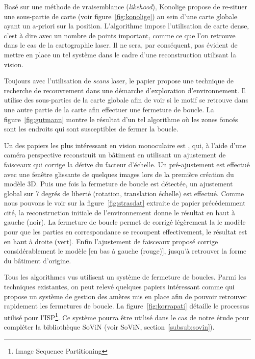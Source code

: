 Basé sur une méthode de vraisemblance (\textit{likehood}), Konolige \cite{Konolige03} propose de re-situer une sous-partie de carte (voir figure~\ref{fig:konolige}) au sein d'une carte globale ayant un a-priori sur la position.
L'algorithme impose l'utilisation de carte dense, c'est à dire avec un nombre de points important, comme ce que l'on retrouve dans le cas de la cartographie laser.
Il ne sera, par conséquent, pas évident de mettre en place un tel système dans le cadre d'une reconstruction utilisant la vision.

Toujours avec l'utilisation de \emph{scans} laser, le papier \cite{Gutmann99} propose une technique de recherche de recouvrement dans une démarche d'exploration d'environnement. 
Il utilise des sous-parties de la carte globale afin de voir si le motif se retrouve dans une autre partie de la carte afin effectuer une fermeture de boucle.
La figure~\ref{fig:gutmann} montre le résultat d'un tel algorithme où les zones foncés sont les endroits qui sont susceptibles de fermer la boucle. 

Un des papiers les plus intéressant en vision monoculaire est \cite{Strasdat10}, qui, à l'aide d'une caméra perspective reconstruit un bâtiment en utilisant un ajustement de faisceaux qui corrige la dérive du facteur d'échelle.
Un pré-ajustement est effectué avec une fenêtre glissante de quelques images lors de la première création du modèle 3D.
Puis une fois la fermeture de boucle est détectée, un ajustement global sur 7 degrés de liberté (rotation, translation échelle) est effectué.
Comme nous pouvons le voir sur la figure~\ref{fig:strasdat} extraite de papier précédemment cité, la reconstruction initiale de l'environnement donne le résultat en haut à gauche (noir).
La fermeture de boucle permet de corrigé légèrement la le modèle pour que les parties en correspondance se recoupent effectivement, le résultat est en haut à droite (vert).
Enfin l'ajustement de faisceaux proposé corrige considérablement le modèle [en bas à gauche (rouge)], jusqu'à retrouver la forme du bâtiment d'origine.

\vspace{5mm}
Tous les algorithmes vus utilisent un système de fermeture de boucles.
Parmi les techniques existantes, on peut relevé quelques papiers intéressant comme \cite{Korrapati11} qui propose un système de gestion des amères mis en place afin de pouvoir retrouver rapidement les fermetures de boucle.
La figure~\ref{fig:korrapati} détaille le processus utilisé pour l'ISP\footnote{Image Sequence Partitioning}.
Ce système pourra être utilisé dans le cas de notre étude pour compléter la bibliothèque SoViN (voir SoViN, section~\ref{subsub:sovin}).



